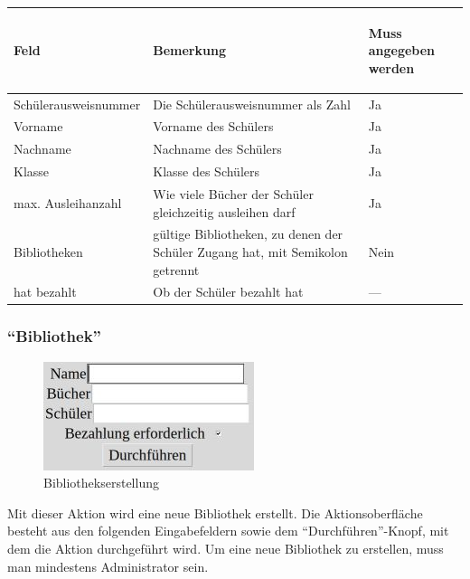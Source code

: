 \begin{tabular}{|p{}|p{}|p{}|}\hline
\begin{center}Feld\end{center} & \begin{center}Bemerkung\end{center} & \begin{center}Muss angegeben werden\end{center}\\
\hline
Schüler\-ausweis\-nummer & Die Schülerausweisnummer als Zahl & Ja\\
\hline
Vorname & Vorname des Schülers & Ja\\
\hline
Nachname & Nachname des Schülers & Ja\\
\hline
Klasse & Klasse des Schülers & Ja\\
\hline
max. \mbox{Ausleihanzahl} & Wie viele Bücher der Schüler gleichzeitig ausleihen darf & Ja\\
\hline
Bibliotheken & gültige Bibliotheken, zu denen der Schüler Zugang hat, mit Semikolon getrennt & Nein\\
\hline
hat bezahlt & Ob der Schüler bezahlt hat &   ---\\
\hline
\end{tabular}

\subsubsection{``Bibliothek''}
\label{subsubsec:detail:new:library}
\begin{figure}\includegraphics{images/gui2/new_library.jpg}\caption{Bibliothekserstellung}\label{fig:new_library}\end{figure}

Mit dieser Aktion wird eine neue Bibliothek erstellt. Die Aktionsoberfläche besteht aus den folgenden Eingabefeldern sowie dem ``Durchführen''-Knopf, mit dem die Aktion durchgeführt wird.
Um eine neue Bibliothek zu erstellen, muss man mindestens Administrator sein.


